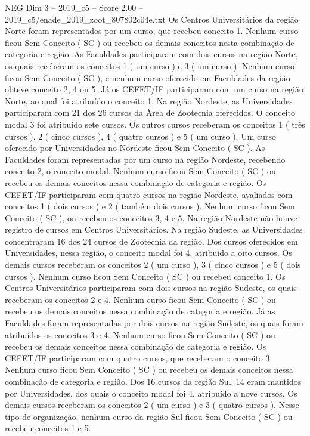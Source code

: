 \begin{textsample}{NEG Dim 3 – 2019\_c5 – Score 2.00 – 2019\_c5/enade\_2019\_zoot\_807802c04e.txt}
Os Centros Universitários da região Norte foram representados por um curso, que recebeu conceito 1.
Nenhum curso ficou Sem Conceito ( SC ) ou recebeu os demais conceitos nesta combinação de categoria e região.
As Faculdades participaram com dois cursos na região Norte, os quais receberam os conceitos 1 ( um curso ) e 3 ( um curso ).
Nenhum curso ficou Sem Conceito ( SC ), e nenhum curso oferecido em Faculdades da região obteve conceito 2, 4 ou 5.
Já os CEFET/IF participaram com um curso na região Norte, ao qual foi atribuído o conceito 1.
Na região Nordeste, as Universidades participaram com 21 dos 26 cursos da Área de Zootecnia oferecidos.
O conceito modal 3 foi atribuído sete cursos.
Os outros cursos receberam os conceitos 1 ( três cursos ), 2 ( cinco cursos ), 4 ( quatro cursos ) e 5 ( um curso ).
Um curso oferecido por Universidades no Nordeste ficou Sem Conceito ( SC ).
As Faculdades foram representadas por um curso na região Nordeste, recebendo conceito 2, o conceito modal.
Nenhum curso ficou Sem Conceito ( SC ) ou recebeu os demais conceitos nessa combinação de categoria e região.
Os CEFET/IF participaram com quatro cursos na região Nordeste, avaliados com conceitos 1 ( dois cursos ) e 2 ( também dois cursos ).
Nenhum curso ficou Sem Conceito ( SC ), ou recebeu os conceitos 3, 4 e 5.
Na região Nordeste não houve registro de cursos em Centros Universitários.
Na região Sudeste, as Universidades concentraram 16 dos 24 cursos de Zootecnia da região.
Dos cursos oferecidos em Universidades, nessa região, o conceito modal foi 4, atribuído a oito cursos.
Os demais cursos receberam os conceitos 2 ( um curso ), 3 ( cinco cursos ) e 5 ( dois cursos ).
Nenhum curso ficou Sem Conceito ( SC ) ou recebeu conceito 1.
Os Centros Universitários participaram com dois cursos na região Sudeste, os quais receberam os conceitos 2 e 4.
Nenhum curso ficou Sem Conceito ( SC ) ou recebeu os demais conceitos nessa combinação de categoria e região.
Já as Faculdades foram representadas por dois cursos na região Sudeste, os quais foram atribuídos os conceitos 3 e 4.
Nenhum curso ficou Sem Conceito ( SC ) ou recebeu os demais conceitos nessa combinação de categoria e região.
Os CEFET/IF participaram com quatro cursos, que receberam o conceito 3.
Nenhum curso ficou Sem Conceito ( SC ) ou recebeu os demais conceitos nessa combinação de categoria e região.
Dos 16 cursos da região Sul, 14 eram mantidos por Universidades, dos quais o conceito modal foi 4, atribuído a nove cursos.
Os demais cursos receberam os conceitos 2 ( um curso ) e 3 ( quatro cursos ).
Nesse tipo de organização, nenhum curso da região Sul ficou Sem Conceito ( SC ) ou recebeu conceitos 1 e 5.

\end{textsample}
